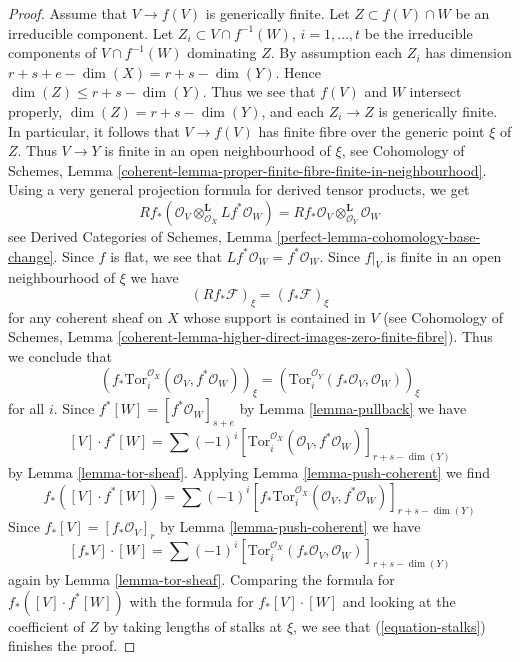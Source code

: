\documentclass{stacks-project}
\theoremstyle{plain}
\theoremstyle{definition}
\theoremstyle{remark}
\numberwithin{equation}{subsection}
\begin{document}
\begin{proof}
\medskip\noindent
Assume that $V \to f(V)$ is generically finite. Let $Z \subset f(V) \cap W$
be an irreducible component. Let $Z_i \subset V \cap f^{-1}(W)$,
$i = 1, \ldots, t$ be the irreducible components of $V \cap f^{-1}(W)$
dominating $Z$. By assumption each $Z_i$ has dimension
$r + s + e - \dim(X) = r + s - \dim(Y)$. Hence
$\dim(Z) \leq r + s - \dim(Y)$. Thus we see that $f(V)$ and $W$
intersect properly, $\dim(Z) = r + s - \dim(Y)$, and each
$Z_i \to Z$ is generically finite. In particular, it follows that
$V \to f(V)$ has finite fibre over the generic point $\xi$ of $Z$.
Thus $V \to Y$ is finite in an open neighbourhood of $\xi$, see
Cohomology of Schemes, Lemma
\ref{coherent-lemma-proper-finite-fibre-finite-in-neighbourhood}.
Using a very general projection formula for derived tensor products, we get
$$
Rf_*(\mathcal{O}_V \otimes_{\mathcal{O}_X}^\mathbf{L} Lf^*\mathcal{O}_W) =
Rf_*\mathcal{O}_V \otimes_{\mathcal{O}_Y}^\mathbf{L} \mathcal{O}_W
$$
see Derived Categories of Schemes, Lemma
\ref{perfect-lemma-cohomology-base-change}.
Since $f$ is flat, we see that $Lf^*\mathcal{O}_W = f^*\mathcal{O}_W$.
Since $f|_V$ is finite in an open neighbourhood of $\xi$ we have
$$
(Rf_*\mathcal{F})_\xi = (f_*\mathcal{F})_\xi
$$
for any coherent sheaf on $X$ whose support is contained in $V$
(see Cohomology of Schemes, Lemma
\ref{coherent-lemma-higher-direct-images-zero-finite-fibre}). Thus
we conclude that
\begin{equation}
\label{equation-stalks}
\left(
f_*\text{Tor}_i^{\mathcal{O}_X}(\mathcal{O}_V, f^*\mathcal{O}_W)
\right)_\xi =
\left(\text{Tor}_i^{\mathcal{O}_Y}(f_*\mathcal{O}_V, \mathcal{O}_W)\right)_\xi
\end{equation}
for all $i$. Since $f^*[W] = [f^*\mathcal{O}_W]_{s + e}$ by
Lemma \ref{lemma-pullback} we have
$$
[V] \cdot f^*[W] =
\sum (-1)^i
[\text{Tor}_i^{\mathcal{O}_X}(\mathcal{O}_V,
f^*\mathcal{O}_W)]_{r + s - \dim(Y)}
$$
by Lemma \ref{lemma-tor-sheaf}. Applying
Lemma \ref{lemma-push-coherent}
we find
$$
f_*([V] \cdot f^*[W]) =
\sum (-1)^i
[f_*\text{Tor}_i^{\mathcal{O}_X}(\mathcal{O}_V,
f^*\mathcal{O}_W)]_{r + s - \dim(Y)}
$$
Since $f_*[V] = [f_*\mathcal{O}_V]_r$ by
Lemma \ref{lemma-push-coherent} we have
$$
[f_*V] \cdot [W] =
\sum (-1)^i
[\text{Tor}_i^{\mathcal{O}_X}(f_*\mathcal{O}_V,
\mathcal{O}_W)]_{r + s - \dim(Y)}
$$
again by Lemma \ref{lemma-tor-sheaf}.
Comparing the formula for $f_*([V] \cdot f^*[W])$ with
the formula for $f_*[V] \cdot [W]$ and looking at the
coefficient of $Z$ by taking lengths of stalks at $\xi$, we see that
(\ref{equation-stalks}) finishes the proof.
\end{proof}
\end{document}
